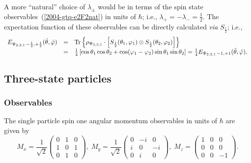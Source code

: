 \documentclass[pra,amsfonts,showpacs,showkeys,preprint]{revtex4}
\begin{document}
A more ``natural'' choice of $\lambda_\pm$ would be in terms of the spin state observables~(\ref{2004-gtq-e2F2nat}) in units of $\hbar$;
i.e., $  \lambda_+ = -  \lambda_- =\frac{1}{2}$.
The expectation function of  these observables can be directly calculated {\it via} $S_{\frac{1}{2}}$; i.e.,
\begin{equation}
\begin{array}{rcl}
E_{{ \Psi_{2,2,1}}\,-\frac{1}{2},+ \frac{1}{2} } ({\hat \theta},{\hat \varphi} )&=&
{\rm Tr}\left\{ \rho_{ \Psi_{2,2,1}} \cdot \left[ S_{\frac{1}{2}}(\theta_1,\varphi_1) \otimes S_{\frac{1}{2}}(\theta_2,\varphi_2)\right]\right\} \\
&=&
\frac{1}{4} \left[\cos
    \theta_1  \cos  \theta_2 +\cos ( \varphi_1 - \varphi_2 ) \sin \theta_1  \sin  \theta_2 \right]
= \frac{1}{4}E_{{ \Psi_{2,2,1}}\,-1 ,+1 } ({\hat \theta},{\hat \varphi} )
.
\label{2009-gtq-sso2}
\end{array}
\end{equation}



\subsection{Three-state particles}

\subsubsection*{Observables}
The single particle  spin one angular momentum observables in units of $\hbar$ are given by~\cite{schiff-55}
\begin{equation}
M_x=
\frac{1}{\sqrt{2}}
\left(
\begin{array}{cccccccccc}
0&1&0\\
1&0&1\\
0&1&0
\end{array}
\right),
\;
M_y=
\frac{1}{\sqrt{2}}
\left(
\begin{array}{cccccccccc}
0&-i&0\\
i&0&-i\\
0&i&0
\end{array}
\right),
\;
M_z=
\left(
\begin{array}{cccccccccc}
1&0&0\\
0&0&0\\
0&0&-1
\end{array}
\right).
\end{equation}
\end{document}
